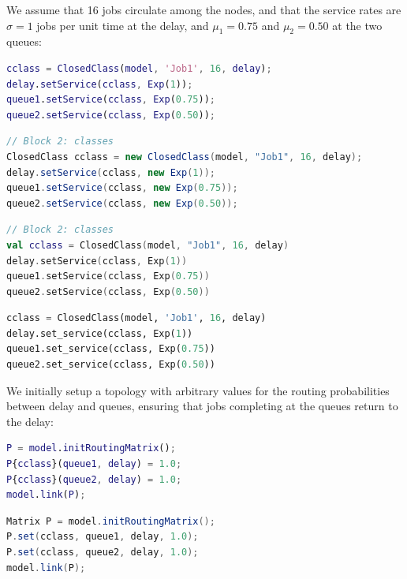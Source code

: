 We assume that 16 jobs circulate among the nodes, and that the service rates are $\sigma=1$ jobs per unit time at the delay, and $\mu_1=0.75$ and $\mu_2=0.50$ at the two queues:
\begin{MATLAB}
\begin{lstlisting}[language = matlab]
% Block 2: classes
cclass = ClosedClass(model, 'Job1', 16, delay);
delay.setService(cclass, Exp(1));
queue1.setService(cclass, Exp(0.75));
queue2.setService(cclass, Exp(0.50));
\end{lstlisting}
\end{MATLAB}
\begin{JAVA}
\begin{lstlisting}[language = java, basicstyle=\ttfamily\scriptsize]
// Block 2: classes
ClosedClass cclass = new ClosedClass(model, "Job1", 16, delay);
delay.setService(cclass, new Exp(1));
queue1.setService(cclass, new Exp(0.75));
queue2.setService(cclass, new Exp(0.50));
\end{lstlisting}
\end{JAVA}
\begin{KOTLIN}
\begin{lstlisting}[language = kotlin, basicstyle=\ttfamily\scriptsize]
// Block 2: classes
val cclass = ClosedClass(model, "Job1", 16, delay)
delay.setService(cclass, Exp(1))
queue1.setService(cclass, Exp(0.75))
queue2.setService(cclass, Exp(0.50))
\end{lstlisting}
\end{KOTLIN}
\begin{PYTHON}
\begin{lstlisting}[language = python]
cclass = ClosedClass(model, 'Job1', 16, delay)
delay.set_service(cclass, Exp(1))
queue1.set_service(cclass, Exp(0.75))
queue2.set_service(cclass, Exp(0.50))
\end{lstlisting}
\end{PYTHON}
We initially setup a topology with arbitrary values for the routing probabilities between delay and queues, ensuring that jobs completing at the queues return to the delay:
\begin{MATLAB}
\begin{lstlisting}[language = matlab]
% Block 3: topology
P = model.initRoutingMatrix();
P{cclass}(queue1, delay) = 1.0;
P{cclass}(queue2, delay) = 1.0;
model.link(P);
\end{lstlisting}
\end{MATLAB}
\begin{JAVA}
\begin{lstlisting}[language = java, basicstyle=\ttfamily\scriptsize]
Matrix P = model.initRoutingMatrix();
P.set(cclass, queue1, delay, 1.0);
P.set(cclass, queue2, delay, 1.0);
model.link(P);
\end{lstlisting}
\end{JAVA}
